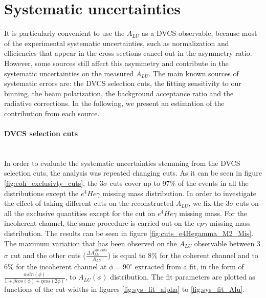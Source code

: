 \section{Systematic uncertainties}

It is particularly convenient to use the $A_{LU}$ as a DVCS observable, 
because most of the experimental systematic uncertainties, such as 
normalization and efficiencies that appear in the cross sections cancel out in 
the asymmetry ratio. However, some sources still affect this asymmetry and 
contribute in the systematic uncertainties on the measured $A_{LU}$. The main 
known sources of systematic errors are: the DVCS selection cuts, the fitting 
sensitivity to our binning, the beam polarization, the background acceptance 
ratio and the radiative corrections. In the following, we present an estimation 
of the contribution from each source.  

 

\paragraph{DVCS selection cuts} ~\\
In order to evaluate the systematic uncertainties stemming from the DVCS 
selection cuts, the analysis was repeated changing cuts. As it can be seen in 
figure \ref{fig:coh_exclusivty_cuts}, the 3$\sigma$ cuts cover up to 97$\%$ of 
the events in all the distributions except the $e^{4}He\gamma$ missing mass 
distribution. In order to investigate the effect of taking different cuts on 
the reconstructed $A_{LU}$, we fix the 3$\sigma$ cuts on all the exclusive 
quantities except for the cut on $e^{4}He\gamma$ missing mass. For the 
incoherent channel, the same procedure is carried out on the $ep\gamma$ missing 
mass distribution. The results can be seen in figure 
\ref{fig:cuts_e4Hegamma_M2_Mis}. The maximum variation that has been observed 
on the $A_{LU}$ observable between 3$\sigma$ cut and the other cuts 
($\frac{\Delta A^{sys. cuts}_{LU}}{A_{LU}}$) is equal to  8$\%$ for the 
coherent channel and to 6$\%$ for the incoherent channel at $\phi = 90^{\circ}$ 
extracted from a fit, in the form of $\frac{\alpha sin(\phi)}{1+\beta cos(\phi) 
+ \eta cos(2\phi)}$, to $A_{LU}(\phi)$ distribution. The fit parameters are 
plotted as functions of the cut widths in figures \ref{fig:sys_fit_alpha} to 
\ref{fig:sys_fit_Alu}.


